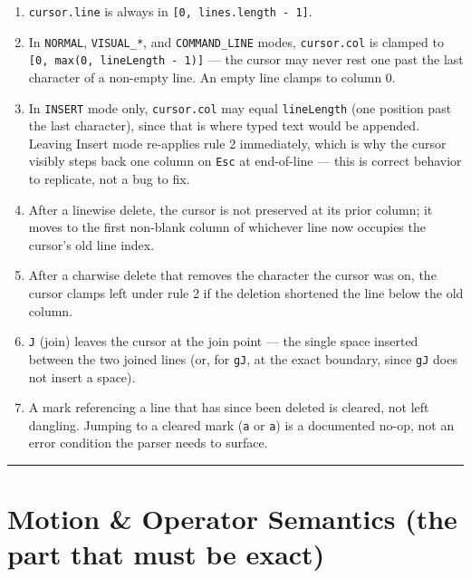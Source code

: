 \documentclass[11pt]{article}
\providecommand{\tightlist}{%
  \setlength{\itemsep}{0pt}\setlength{\parskip}{0pt}}
\begin{document}
\begin{enumerate}
\def\labelenumi{\arabic{enumi}.}
\tightlist
\item
  \texttt{cursor.line} is always in \texttt{{[}0,\ lines.length\ -\ 1{]}}.
\item
  In \texttt{NORMAL}, \texttt{VISUAL\_*}, and \texttt{COMMAND\_LINE} modes, \texttt{cursor.col} is
  clamped to \texttt{{[}0,\ max(0,\ lineLength\ -\ 1){]}} --- the cursor may never rest one
  past the last character of a non-empty line. An empty line clamps to
  column 0.
\item
  In \texttt{INSERT} mode only, \texttt{cursor.col} may equal \texttt{lineLength} (one position
  past the last character), since that is where typed text would be
  appended. Leaving Insert mode re-applies rule 2 immediately, which is why
  the cursor visibly steps back one column on \texttt{Esc} at end-of-line --- this
  is correct behavior to replicate, not a bug to fix.
\item
  After a linewise delete, the cursor is not preserved at its prior column;
  it moves to the first non-blank column of whichever line now occupies
  the cursor's old line index.
\item
  After a charwise delete that removes the character the cursor was on,
  the cursor clamps left under rule 2 if the deletion shortened the line
  below the old column.
\item
  \texttt{J} (join) leaves the cursor at the join point --- the single space
  inserted between the two joined lines (or, for \texttt{gJ}, at the exact
  boundary, since \texttt{gJ} does not insert a space).
\item
  A mark referencing a line that has since been deleted is cleared, not
  left dangling. Jumping to a cleared mark (\texttt{\textasciigrave{}a} or \texttt{\textquotesingle{}a}) is a
  documented no-op, not an error condition the parser needs to surface.
\end{enumerate}

\begin{center}\rule{0.5\linewidth}{0.5pt}\end{center}

\hypertarget{sec-motion-operator-semantics-the-part-that-must-be-exact}{%
\section{Motion \& Operator Semantics (the part that must be exact)}\label{sec-motion-operator-semantics-the-part-that-must-be-exact}}
\end{document}

